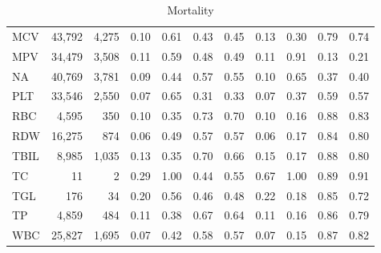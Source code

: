 \begin{table}[ht]
\begin{tabular}{lrrrrrrrrrr}
MCV & 43,792 & 4,275 & 0.10 & 0.61 & 0.43 & 0.45 & 0.13 & 0.30 & 0.79 & 0.74 \\
MPV & 34,479 & 3,508 & 0.11 & 0.59 & 0.48 & 0.49 & 0.11 & 0.91 & 0.13 & 0.21 \\
NA & 40,769 & 3,781 & 0.09 & 0.44 & 0.57 & 0.55 & 0.10 & 0.65 & 0.37 & 0.40 \\
PLT & 33,546 & 2,550 & 0.07 & 0.65 & 0.31 & 0.33 & 0.07 & 0.37 & 0.59 & 0.57 \\
RBC & 4,595 & 350 & 0.10 & 0.35 & 0.73 & 0.70 & 0.10 & 0.16 & 0.88 & 0.83 \\
RDW & 16,275 & 874 & 0.06 & 0.49 & 0.57 & 0.57 & 0.06 & 0.17 & 0.84 & 0.80 \\
TBIL & 8,985 & 1,035 & 0.13 & 0.35 & 0.70 & 0.66 & 0.15 & 0.17 & 0.88 & 0.80 \\
TC & 11 & 2 & 0.29 & 1.00 & 0.44 & 0.55 & 0.67 & 1.00 & 0.89 & 0.91 \\
TGL & 176 & 34 & 0.20 & 0.56 & 0.46 & 0.48 & 0.22 & 0.18 & 0.85 & 0.72 \\
TP & 4,859 & 484 & 0.11 & 0.38 & 0.67 & 0.64 & 0.11 & 0.16 & 0.86 & 0.79 \\
WBC & 25,827 & 1,695 & 0.07 & 0.42 & 0.58 & 0.57 & 0.07 & 0.15 & 0.87 & 0.82 \\
\bottomrule
\end{tabular}
\caption{Mortality}
\end{table}